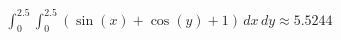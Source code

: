 \documentclass[preview]{standalone}
\begin{document}
\begin{align*}
\int_{0}^{2.5} \int_{0}^{2.5} \left(\sin(x) + \cos(y) + 1\right) \, dx \, dy \approx 5.5244
\end{align*}
\end{document}
